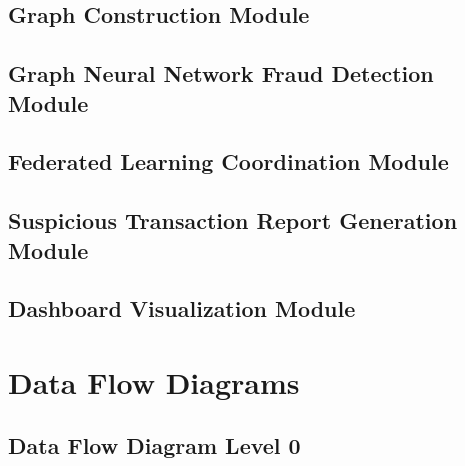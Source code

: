 \subsection[Graph Construction Module]{\textbf{Graph Construction Module}}


\subsection[Graph Neural Network Fraud Detection Module]{\textbf{Graph Neural Network Fraud Detection Module}}


\subsection[Federated Learning Coordination Module]{\textbf{Federated Learning Coordination Module}}


\subsection[Suspicious Transaction Report Generation Module]{\textbf{Suspicious Transaction Report Generation Module}}


\subsection[Dashboard Visualization Module]{\textbf{Dashboard Visualization Module}}


\section[Data Flow Diagrams]{\textbf{Data Flow Diagrams}}

\subsection[Data Flow Diagram Level 0]{\textbf{Data Flow Diagram Level 0}}


